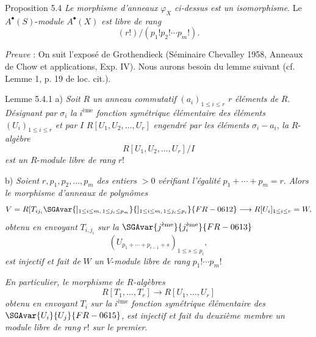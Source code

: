 \begin{statement}{Proposition 5.4}
\emph{Le morphisme d'anneaux} $\varphi_X$ \emph{ci-dessus est un isomorphisme}. Le $A^{\bullet}(S)$-\emph{module} $A^{\bullet}(X)$ \emph{est libre de rang}
\[
(r!)/(p_1!p_2!\cdots p_m!).
\]
\end{statement}

\emph{Preuve} : On
suit l'exposé de Grothendieck (Séminaire Chevalley 1958, Anneaux de Chow et applications, Exp. IV). Nous aurons besoin du lemme suivant (cf. Lemme 1, p. 19 de loc. cit.).

\begin{statement}{Lemme 5.4.1}
a) \emph{Soit} $R$ \emph{un anneau commutatif} $(a_i)_{1\le i\le r}$ $r$ \emph{éléments de} $R$. \emph{Désignant par} $\sigma_i$ \emph{la} $i^{\text{ème}}$ \emph{fonction symétrique élémentaire des éléments} $(U_i)_{1\le i\le r}$ \emph{et par} $I$  $R[U_1,U_2,\ldots,U_r]$ \emph{engendré par les éléments} $\sigma_i-a_i$, \emph{la} $R$-\emph{algèbre}
\[
R[U_1,U_2,\ldots,U_r]/I
\]
\emph{est un} $R$-\emph{module libre de rang} $r!$

b) \emph{Soient} $r,p_1,p_2,\ldots,p_m$ \emph{des entiers} $>0$ \emph{vérifiant l'égalité} $p_1+\cdots+p_m=r$. \emph{Alors le morphisme d'anneaux de polynômes}
\[
V=R[T_{ij_i}\SGAvar{]_{1\le i\le m,\,1\le j_i\le p_m}}{]_{1\le i\le m,\,1\le j_i\le p_i}}{FR-0612}
\longrightarrow R[U_i]_{1\le i\le r}=W,
\]
\emph{obtenu en envoyant} $T_{i,j_i}$ \emph{sur la} $\SGAvar{j^{\text{ème}}}{j_i^{\text{ème}}}{FR-0613}$ 
\[
(U_{p_1+\cdots+p_{i-1}+s})_{1\le s\le p_i},
\]
\emph{est injectif et fait de} $W$ \emph{un} $V$-\emph{module libre de rang} $p_1!\cdots p_m!$

\emph{En particulier, le morphisme de $R$-algèbres}
\[
R[T_1,\ldots,T_r]\to R[U_1,\ldots,U_r]
\]
\emph{obtenu en envoyant} $T_i$ \emph{sur la} $i^{\text{ème}}$ \emph{fonction symétrique élémentaire des} $\SGAvar{U_i}{U_j}{FR-0615}$, \emph{est injectif et fait du deuxième membre un module libre de rang} $r!$ \emph{sur le premier}.
\end{statement}

